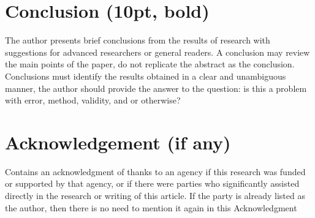 \documentclass{article}
\begin{document}
\section{Conclusion (10pt, bold)}
The author presents brief conclusions from the results of research with suggestions for advanced researchers or general readers. A conclusion may review the main points of the paper, do not replicate the abstract as the conclusion. Conclusions must identify the results obtained in a clear and unambiguous manner, the author should provide the answer to the question: is this a problem with error, method, validity, and or otherwise?

\section{Acknowledgement (if any)}
Contains an acknowledgment of thanks to an agency if this research was funded or supported by that agency, or if there were parties who significantly assisted directly in the research or writing of this article. If the party is already listed as the author, then there is no need to mention it again in this Acknowledgment

\end{document}
